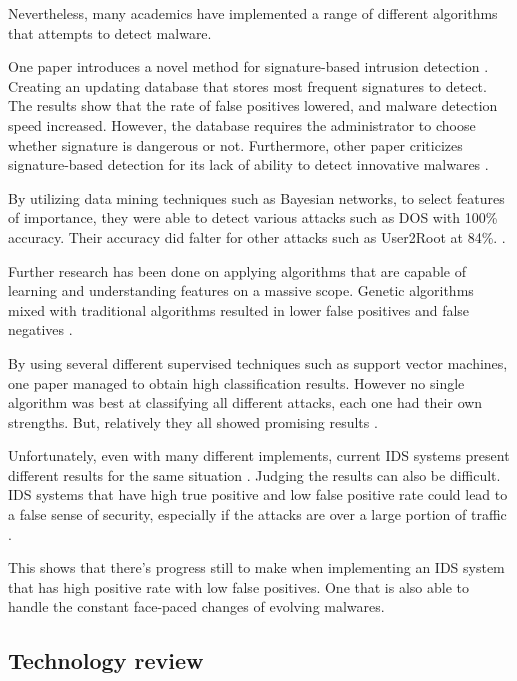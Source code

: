 \documentclass[11pt]{article}
\begin{document}
Nevertheless, many academics have implemented a range of different algorithms that attempts to detect malware. 

One paper introduces a novel method for signature-based intrusion detection \cite{related-work-signature-based}. Creating an updating database that stores most frequent signatures to detect. The results show that the rate of false positives lowered, and malware detection speed increased. However, the database requires the administrator to choose whether signature is dangerous or not. Furthermore, other paper criticizes signature-based detection for its lack of ability to detect innovative malwares \cite{related-work-criticise-signature}. 
 
By utilizing data mining techniques such as Bayesian networks, to select features of importance, they were able to detect various attacks such as DOS with 100\% accuracy. Their accuracy did falter for other attacks such as User2Root at 84\%. \cite{related-work-main-approaches}.

Further research has been done on applying algorithms that are capable of learning and understanding features on a massive scope. Genetic algorithms mixed with traditional algorithms resulted in lower false positives and false negatives \cite{related-work-criticise-signature}. 

By using several different supervised techniques such as support vector machines, one paper managed to obtain high classification results. However no single algorithm was best at classifying all different attacks, each one had their own strengths. But, relatively they all showed promising results \cite{related-work-supe}. 

Unfortunately, even with many different implements, current IDS systems present different results for the same situation \cite{related-work-advantages-and-disadvantages}. Judging the results can also be difficult. IDS systems that have high true positive and low false positive rate could lead to a false sense of security, especially if the attacks are over a large portion of traffic \cite{related-work-advantages-and-disadvantages}.

This shows that there’s progress still to make when implementing an IDS system that has high positive rate with low false positives. One that is also able to handle the constant face-paced changes of evolving malwares.

\subsection{Technology review}
\end{document}
